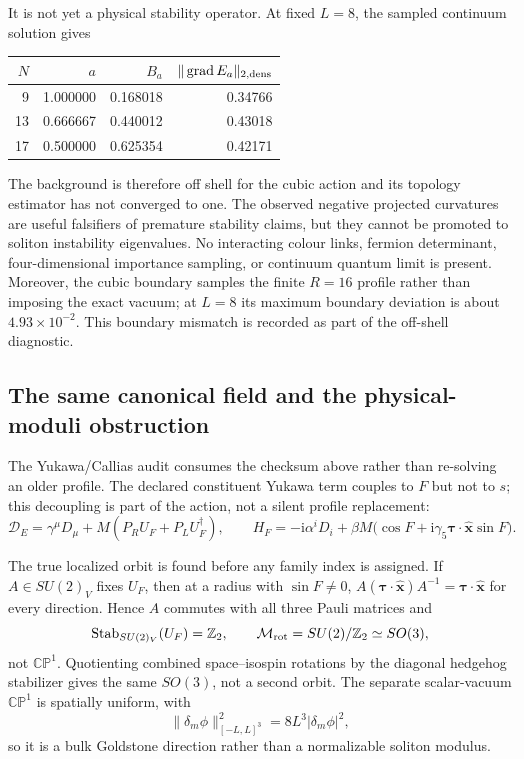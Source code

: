 \documentclass[11pt]{article}
\numberwithin{equation}{section}
\newcommand{\CP}{\mathbb{CP}}
\newcommand{\ZZ}{\mathbb Z}
\newcommand{\ii}{\mathrm i}
\begin{document}
It is not yet a physical stability operator.  At fixed \(L=8\), the sampled
continuum solution gives
\begin{center}
\begin{tabular}{rrrr}
\toprule
\(N\)&\(a\)&\(B_a\)&
\(\|\operatorname{grad}E_a\|_{2,{\rm dens}}\)\\
\midrule
9&1.000000&0.168018&0.34766\\
13&0.666667&0.440012&0.43018\\
17&0.500000&0.625354&0.42171\\
\bottomrule
\end{tabular}
\end{center}
The background is therefore off shell for the cubic action and its topology
estimator has not converged to one.  The observed negative projected
curvatures are useful falsifiers of premature stability claims, but they
cannot be promoted to soliton instability eigenvalues.  No interacting
colour links, fermion determinant, four-dimensional importance sampling, or
continuum quantum limit is present.
Moreover, the cubic boundary samples the finite \(R=16\) profile rather than
imposing the exact vacuum; at \(L=8\) its maximum boundary deviation is about
\(4.93\times10^{-2}\).  This boundary mismatch is recorded as part of the
off-shell diagnostic.

\subsection{The same canonical field and the physical-moduli obstruction}

The Yukawa/Callias audit consumes the checksum above rather than re-solving
an older profile.  The declared constituent Yukawa term couples to \(F\) but
not to \(s\); this decoupling is part of the action, not a silent profile
replacement:
\begin{equation}
 \mathcal D_E=\gamma^\mu D_\mu
 +M(P_RU_F+P_LU_F^\dagger),\qquad
 H_F=-\ii\alpha^iD_i+\beta M
 \bigl(\cos F+\ii\gamma_5\bm\tau\!\cdot\!\widehat{\bm x}\sin F\bigr).
 \label{eq:e6-yukawa-operator}
\end{equation}

The true localized orbit is found before any family index is assigned.  If
\(A\in SU(2)_V\) fixes \(U_F\), then at a radius with \(\sin F\ne0\),
\(A(\bm\tau\cdot\widehat{\bm x})A^{-1}
=\bm\tau\cdot\widehat{\bm x}\) for every direction.  Hence \(A\) commutes
with all three Pauli matrices and
\begin{equation}
 \operatorname{Stab}_{SU(2)_V}(U_F)=\ZZ_2,\qquad
 \mathcal M_{\rm rot}=SU(2)/\ZZ_2\simeq SO(3),
 \label{eq:e6-actual-moduli}
\end{equation}
not \(\CP^1\).  Quotienting combined space--isospin rotations by the
diagonal hedgehog stabilizer gives the same \(SO(3)\), not a second orbit.
The separate scalar-vacuum \(\CP^1\) is spatially uniform, with
\begin{equation}
 \|\delta_m\phi\|^2_{[-L,L]^3}=8L^3|\delta_m\phi|^2,
 \label{eq:e6-bulk-cp1-norm}
\end{equation}
so it is a bulk Goldstone direction rather than a normalizable soliton
modulus.
\end{document}
